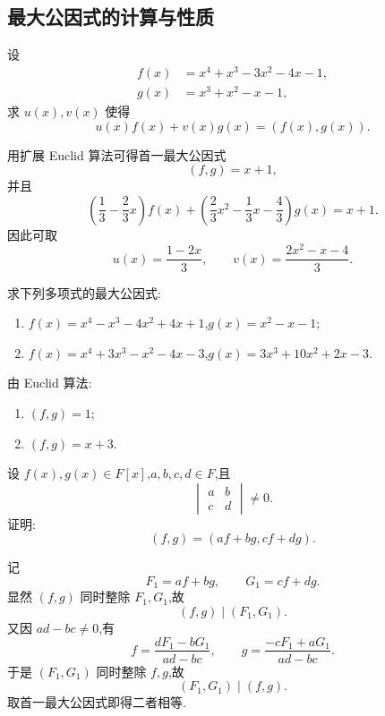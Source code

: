 \subsection{最大公因式的计算与性质}

\begin{example}
设
\[
\begin{aligned}
  f(x)&=x^4+x^3-3x^2-4x-1,\\
  g(x)&=x^3+x^2-x-1,
\end{aligned}
\]
求 $u(x),v(x)$ 使得
\[
  u(x)f(x)+v(x)g(x)=(f(x),g(x)).
\]
\end{example}
\exampleblank

\begin{solution}
用扩展 Euclid 算法可得首一最大公因式
\[
  (f,g)=x+1,
\]
并且
\[
  \left(\dfrac13-\dfrac23x\right)f(x)
  +\left(\dfrac23x^2-\dfrac13x-\dfrac43\right)g(x)
  =x+1.
\]
因此可取
\[
  u(x)=\dfrac{1-2x}{3},
  \qquad
  v(x)=\dfrac{2x^2-x-4}{3}.
\]
\end{solution}

\begin{example}
求下列多项式的最大公因式:
\begin{enumerate}
  \item $f(x)=x^4-x^3-4x^2+4x+1$,$g(x)=x^2-x-1$;
  \item $f(x)=x^4+3x^3-x^2-4x-3$,$g(x)=3x^3+10x^2+2x-3$.
\end{enumerate}
\end{example}
\exampleblank

\begin{solution}
由 Euclid 算法:
\begin{enumerate}
  \item $(f,g)=1$;
  \item $(f,g)=x+3$.
\end{enumerate}
\end{solution}

\begin{example}[\markstar]
设 $f(x),g(x)\in F[x]$,$a,b,c,d\in F$,且
\[
  \begin{vmatrix}
    a&b\\
    c&d
  \end{vmatrix}\neq0.
\]
证明:
\[
  (f,g)=(af+bg,cf+dg).
\]
\end{example}
\exampleblank

\begin{solution}
记
\[
  F_1=af+bg,\qquad G_1=cf+dg.
\]
显然 $(f,g)$ 同时整除 $F_1,G_1$,故
\[
  (f,g)\mid(F_1,G_1).
\]
又因 $ad-bc\neq0$,有
\[
  f=\dfrac{dF_1-bG_1}{ad-bc},
  \qquad
  g=\dfrac{-cF_1+aG_1}{ad-bc}.
\]
于是 $(F_1,G_1)$ 同时整除 $f,g$,故
\[
  (F_1,G_1)\mid(f,g).
\]
取首一最大公因式即得二者相等.
\end{solution}

